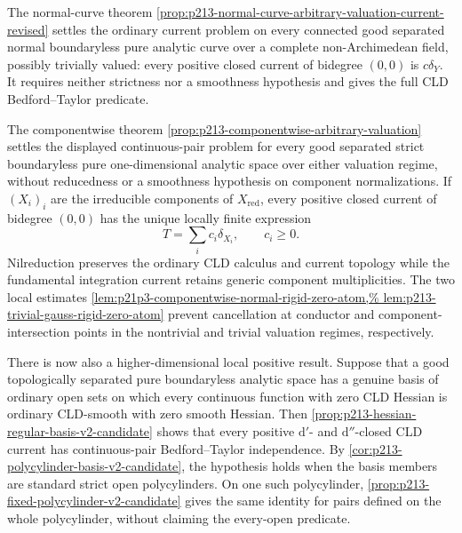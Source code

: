The normal-curve theorem
\cref{prop:p213-normal-curve-arbitrary-valuation-current-revised} settles the
ordinary current problem on every connected good separated normal
boundaryless pure analytic curve over a complete non-Archimedean field,
possibly trivially valued: every positive closed current of bidegree
\((0,0)\) is \(c\delta_Y\).  It requires neither strictness nor a smoothness
hypothesis and gives the full CLD Bedford--Taylor predicate.

The componentwise theorem
\cref{prop:p213-componentwise-arbitrary-valuation} settles the displayed
continuous-pair problem for every good separated strict boundaryless pure
one-dimensional analytic space over either valuation regime, without
reducedness or a smoothness hypothesis on component normalizations.  If
\((X_i)_i\) are the irreducible components of \(X_{\mathrm{red}}\), every
positive closed current of bidegree \((0,0)\) has the unique locally finite
expression
\[
                         T=\sum_i c_i\delta_{X_i},
                         \qquad c_i\geq0.
\]
Nilreduction preserves the ordinary CLD calculus and current topology while
the fundamental integration current retains generic component
multiplicities.  The two local estimates
\cref{lem:p21p3-componentwise-normal-rigid-zero-atom,%
lem:p213-trivial-gauss-rigid-zero-atom} prevent cancellation at conductor
and component-intersection points in the nontrivial and trivial valuation
regimes, respectively.

There is now also a higher-dimensional local positive result.  Suppose that
a good topologically separated pure boundaryless analytic space has a
genuine basis of ordinary open sets on which every continuous function with
zero CLD Hessian is ordinary CLD-smooth with zero smooth Hessian.  Then
\cref{prop:p213-hessian-regular-basis-v2-candidate} shows that every positive
\(\mathrm d'\)- and \(\mathrm d''\)-closed CLD current has
continuous-pair Bedford--Taylor independence.  By
\cref{cor:p213-polycylinder-basis-v2-candidate}, the hypothesis holds when
the basis members are standard strict open polycylinders.  On one such
polycylinder, \cref{prop:p213-fixed-polycylinder-v2-candidate} gives the
same identity for pairs defined on the whole polycylinder, without claiming
the every-open predicate.


